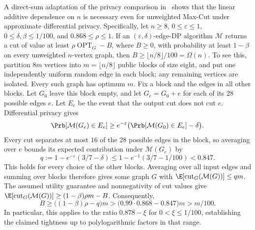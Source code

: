 \begin{remark}\label{rem:maxcut-tightness}
A direct-sum adaptation of the privacy comparison in~\cite{dharangutte2026price}
shows that the linear additive dependence on $n$ is necessary even for unweighted
Max-Cut under approximate differential privacy. Specifically, let $n\geq8$, $0\leq\varepsilon\leq1$,
$0\leq\delta,\beta\leq1/100$, and $0.868\leq\rho\leq1$.
If an $(\varepsilon,\delta)$-edge-DP algorithm $\mathcal M$ returns a cut of value
at least $\rho\operatorname{OPT}_G-B$, where $B\geq0$, with probability at least
$1-\beta$ on every unweighted $n$-vertex graph, then
$B\geq\lfloor n/8\rfloor/100=\Omega(n)$.
To see this, partition $8m$ vertices into $m=\lfloor n/8\rfloor$ public blocks
of size eight, and put one independently uniform random edge in each block;
any remaining vertices are isolated. Every such graph has optimum $m$.
Fix a block and the edges in all other blocks. Let $G_0$ leave this block empty,
and let $G_e=G_0+e$ for each of its $28$ possible edges $e$.
Let $E_e$ be the event that the output cut does not cut $e$.
Differential privacy gives
\[
 \Prb[\mathcal M(G_e)\in E_e]
 \geq e^{-\varepsilon}\bigl(\Prb[\mathcal M(G_0)\in E_e]-\delta\bigr).
\]
Every cut separates at most $16$ of the $28$ possible edges in the block, so
averaging over $e$ bounds its expected contribution under $\mathcal M(G_e)$ by
\[
 q:=1-e^{-\varepsilon}(3/7-\delta)
 \leq1-e^{-1}(3/7-1/100)<0.847.
\]
This holds for every choice of the other blocks. Averaging over all input edges
and summing over blocks therefore gives some graph $G$ with
$\E[\operatorname{cut}_G(\mathcal M(G))]\leq qm$.
The assumed utility guarantee and nonnegativity of cut values give
$\E[\operatorname{cut}_G(\mathcal M(G))]\geq(1-\beta)\rho m-B$.
Consequently,
\[
 B\geq\bigl((1-\beta)\rho-q\bigr)m
 >\bigl(0.99\cdot0.868-0.847\bigr)m>m/100.
\]
In particular, this applies to the ratio $0.878-\xi$ for $0<\xi\leq1/100$,
establishing the claimed tightness up to polylogarithmic factors in that range.
\end{remark}

